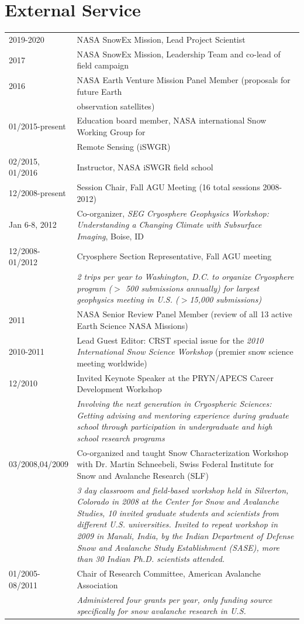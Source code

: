 \documentclass[11pt]{article}
\renewcommand\arraystretch{1}
\begin{document}
\section*{External Service}
\begingroup
\renewcommand\arraystretch{0.7}
\begin{longtable}{p{1.2in}|p{5.7in}}
2019-2020 & NASA SnowEx Mission, Lead Project Scientist \\
2017 & NASA SnowEx Mission, Leadership Team and co-lead of field campaign \\
2016 & NASA Earth Venture Mission Panel Member (proposals for future Earth \\ 
& observation satellites) \\
01/2015-present & Education board member, NASA international Snow Working Group for \\ 
& Remote Sensing (iSWGR) \\
02/2015, 01/2016 & Instructor, NASA iSWGR field school \\
12/2008-present & Session Chair, Fall AGU Meeting (16 total sessions 2008-2012) \\
Jan 6-8, 2012 & Co-organizer, \textit{SEG Cryosphere Geophysics Workshop: Understanding a Changing Climate with Subsurface Imaging}, Boise, ID \\
12/2008-01/2012 & Cryosphere Section Representative, Fall AGU meeting \\
&\textit{2 trips per year to Washington, D.C. to organize Cryosphere program ($>$ 500 
submissions annually) for largest geophysics meeting in U.S. ($>$15,000 submissions)} \\
2011 & NASA Senior Review Panel Member (review of all 13 active Earth Science NASA Missions)  \\
2010-2011 & Lead Guest Editor: CRST special issue for the \textit{2010 International Snow
Science Workshop} (premier snow science meeting worldwide) \\
12/2010 & Invited Keynote Speaker at the PRYN/APECS Career Development Workshop \\
& \textit{Involving the next generation in Cryospheric Sciences: Getting advising and mentoring experience during graduate school through participation in undergraduate and high school research programs} \\

03/2008,04/2009 & Co-organized and taught Snow Characterization Workshop with Dr. Martin Schneebeli, Swiss Federal Institute for Snow and Avalanche Research (SLF) \\
& \textit{3 day classroom and field-based workshop held in Silverton, Colorado in 2008 at the Center for Snow and Avalanche Studies, 10 invited graduate students and scientists from different U.S. universities.  Invited to repeat workshop in 2009 in Manali, India, by the Indian Department of Defense Snow and Avalanche Study Establishment (SASE), more than 30 Indian Ph.D. scientists attended.} \\
01/2005-08/2011 & Chair of Research Committee, American Avalanche Association \\
& \textit{Administered four grants per year, only funding source specifically for snow avalanche research in U.S.} \\


\end{longtable}
\end{document}
